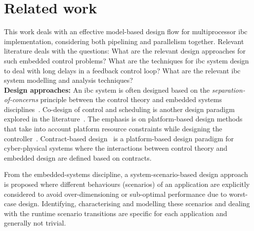 \section{Related work}
\label{sec:ch7_relatedWork}
This work deals with an effective model-based design flow for multiprocessor \gls{ibc} implementation, considering both pipelining and parallelism together. 
Relevant literature deals with the questions: What are the relevant design approaches for such embedded control problems? What are the techniques for \gls{ibc} system design to deal with long delays in a feedback control loop? What are the relevant \gls{ibc} system modelling and analysis techniques?\\

\noindent\textbf{Design approaches:} An \gls{ibc} system is often designed based on the \emph{separation-of-concerns} principle between the control theory and embedded systems disciplines~\cite{arzen2000introduction,saidi2018future}.
Co-design of control and scheduling is another design paradigm explored in the literature~\cite{cervin2003does}.
The emphasis is on platform-based design methods that take into account platform resource constraints while designing the controller~\cite{arzen2000introduction,goswami2013multirate}.
Contract-based design~\cite{sangiovanni2012taming} is a platform-based design paradigm for cyber-physical systems where the interactions between control theory and embedded design are defined based on contracts.

From the embedded-systems discipline, a system-scenario-based design approach~\cite{gheorghita2009system} is proposed where different behaviours (scenarios) of an application are explicitly considered to avoid over-dimensioning or sub-optimal performance due to worst-case design. 
Identifying, characterising and modelling these scenarios and dealing with the runtime scenario transitions are specific for each application and generally not trivial. 

